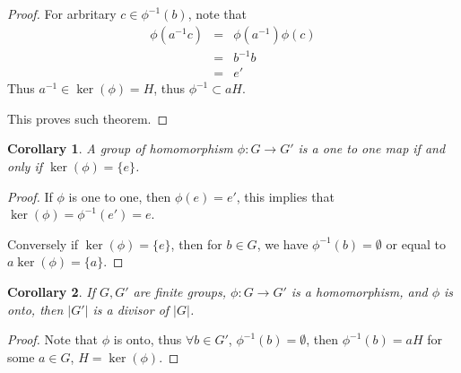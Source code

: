 \documentclass{article}
\theoremstyle{MyNonumberplain}
\theoremstyle{break}
\newtheorem*{proof}{Proof. }
\newcommand{\p}{\phi}
\theoremstyle{break}
\newtheorem{corollary}{Corollary}[theorem]
\theoremstyle{break}
\theoremstyle{definition}
\theoremstyle{break}
\begin{document}
\begin{thmbox}
\begin{prfbox}
\begin{proof}
                    For arbritary $c \in \p^{- 1} (b)$, note that
                    \begin{eqnarray*}
                    \p (a^{- 1} c) & = & \p (a^{- 1}) \p (c)\\
                    & = & b^{- 1} b\\
                    & = & e'
                    \end{eqnarray*}
                    Thus $a^{- 1} \in \ker \left( \p \right) = H$, thus $\p^{- 1} \subset a H$.\bigskip

                    This proves such theorem.
                \end{proof}
            \end{prfbox}
\end{thmbox}

\begin{thmbox}
    \begin{corollary}
        A group of homomorphism $\p : G \rightarrow G'$ is a one to one map if and only if $\ker
        \left( \p \right) = \{ e \}$.
    \end{corollary}
    \begin{prfbox}
        \begin{proof}
            If $\p$ is one to one, then $\p (e) = e'$, this implies that $ \ker \left( \p
            \right) = \p^{- 1} (e') = e$.\bigskip

            Conversely if $\ker \left( \p \right) = \{ e \}$, then for $b \in G$, we have
            $\p^{- 1} (b) = \emptyset$ or equal to $a \ker \left( \p \right) = \{ a \}$.
        \end{proof}
    \end{prfbox}
\end{thmbox}

\begin{thmbox}
    \begin{corollary}
        If $G, G'$ are finite groups, $\p : G \rightarrow G'$ is a homomorphism, and
        $\p$ is onto, then $| G' |$ is a divisor of $| G |$.
    \end{corollary}
    \begin{prfbox}
        \begin{proof}
            Note that $\p$ is onto, thus $\forall b \in G'$, $\p^{- 1} (b) = \emptyset$,
            then $\p^{- 1} (b) = a H$ for some $a \in G$, $H = \ker \left( \p \right)$.
        \end{proof}
    \end{prfbox}
\end{thmbox}
\end{document}
